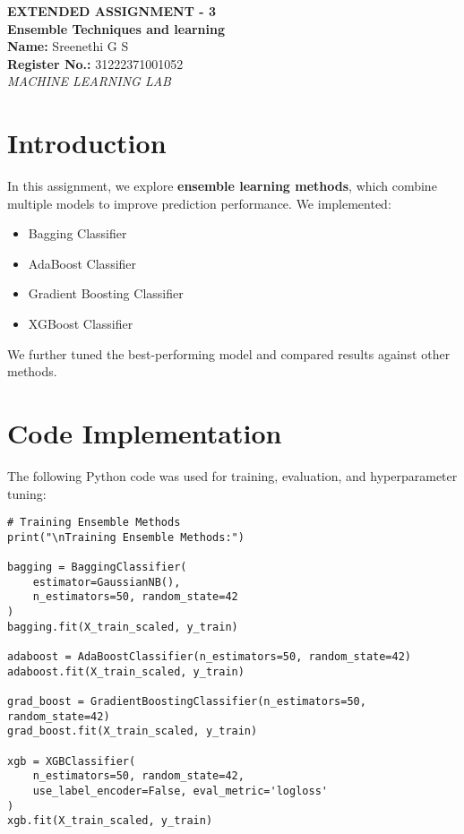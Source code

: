 \documentclass[12pt]{article}
\begin{document}
\newpage
\begin{titlepage}
    \centering
    \vspace*{3cm}
    
    {\LARGE \textbf{EXTENDED ASSIGNMENT - 3}}\\[1.5cm]
    
    {\Large \textbf{Ensemble Techniques and learning}}\\[2cm]
    
    {\large \textbf{Name:} Sreenethi G S}\\[0.4cm]
    {\large \textbf{Register No.:} 31222371001052}\\[0.4cm]
    
    {\large \textit{MACHINE LEARNING LAB}}\\[6cm]
    
    \vfill
\end{titlepage}


\section{Introduction}
In this assignment, we explore \textbf{ensemble learning methods}, which combine multiple models to improve prediction performance. We implemented:
\begin{itemize}
    \item Bagging Classifier
    \item AdaBoost Classifier
    \item Gradient Boosting Classifier
    \item XGBoost Classifier
\end{itemize}
We further tuned the best-performing model and compared results against other methods.

\section{Code Implementation}
The following Python code was used for training, evaluation, and hyperparameter tuning:

\begin{lstlisting}
# Training Ensemble Methods
print("\nTraining Ensemble Methods:")

bagging = BaggingClassifier(
    estimator=GaussianNB(),
    n_estimators=50, random_state=42
)
bagging.fit(X_train_scaled, y_train)

adaboost = AdaBoostClassifier(n_estimators=50, random_state=42)
adaboost.fit(X_train_scaled, y_train)

grad_boost = GradientBoostingClassifier(n_estimators=50, random_state=42)
grad_boost.fit(X_train_scaled, y_train)

xgb = XGBClassifier(
    n_estimators=50, random_state=42,
    use_label_encoder=False, eval_metric='logloss'
)
xgb.fit(X_train_scaled, y_train)
\end{lstlisting}
\end{document}
